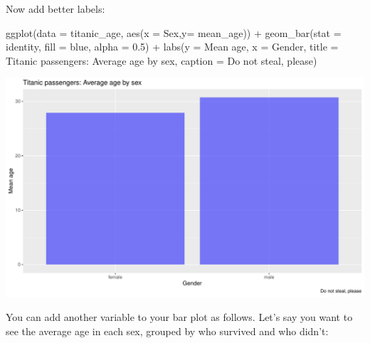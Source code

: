 \documentclass[
]{book}
\newenvironment{Shaded}{\begin{snugshade}}{\end{snugshade}}
\newcommand{\AttributeTok}[1]{\textcolor[rgb]{0.77,0.63,0.00}{#1}}
\newcommand{\FloatTok}[1]{\textcolor[rgb]{0.00,0.00,0.81}{#1}}
\newcommand{\FunctionTok}[1]{\textcolor[rgb]{0.00,0.00,0.00}{#1}}
\newcommand{\NormalTok}[1]{#1}
\newcommand{\SpecialCharTok}[1]{\textcolor[rgb]{0.00,0.00,0.00}{#1}}
\newcommand{\StringTok}[1]{\textcolor[rgb]{0.31,0.60,0.02}{#1}}
\begin{document}
Now add better labels:

\begin{Shaded}
\begin{Highlighting}[]
\FunctionTok{ggplot}\NormalTok{(}\AttributeTok{data =}\NormalTok{ titanic\_age, }
       \FunctionTok{aes}\NormalTok{(}\AttributeTok{x =}\NormalTok{ Sex,}\AttributeTok{y=}\NormalTok{ mean\_age)) }\SpecialCharTok{+} 
  \FunctionTok{geom\_bar}\NormalTok{(}\AttributeTok{stat =} \StringTok{\textquotesingle{}identity\textquotesingle{}}\NormalTok{, }\AttributeTok{fill =} \StringTok{\textquotesingle{}blue\textquotesingle{}}\NormalTok{, }\AttributeTok{alpha =} \FloatTok{0.5}\NormalTok{) }\SpecialCharTok{+} 
  \FunctionTok{labs}\NormalTok{(}\AttributeTok{y =} \StringTok{\textquotesingle{}Mean age\textquotesingle{}}\NormalTok{, }
       \AttributeTok{x =} \StringTok{\textquotesingle{}Gender\textquotesingle{}}\NormalTok{,}
       \AttributeTok{title =} \StringTok{\textquotesingle{}Titanic passengers: Average age by sex\textquotesingle{}}\NormalTok{,}
       \AttributeTok{caption =} \StringTok{\textquotesingle{}Do not steal, please\textquotesingle{}}\NormalTok{)}
\end{Highlighting}
\end{Shaded}

\includegraphics{figures/unnamed-chunk-165-1.pdf}

You can add another variable to your bar plot as follows. Let's say you want to see the average age in each sex, grouped by who survived and who didn't:
\end{document}
